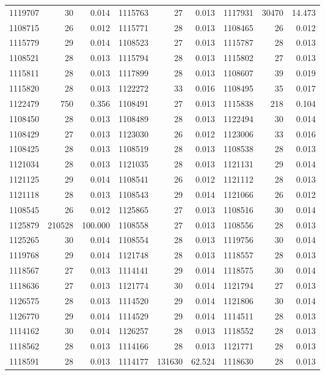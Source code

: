 \documentclass[11pt,a4paper]{article}
\begin{document}
\begin{longtable}{rrr|rrr|rrr}
1119707 & 30 & 0.014 & 1115763 & 27 & 0.013 & 1117931 & 30470 & 14.473\\
1108715 & 26 & 0.012 & 1115771 & 28 & 0.013 & 1108465 & 26 & 0.012\\
1115779 & 29 & 0.014 & 1108523 & 27 & 0.013 & 1115787 & 28 & 0.013\\
1108521 & 28 & 0.013 & 1115794 & 28 & 0.013 & 1115802 & 27 & 0.013\\
1115811 & 28 & 0.013 & 1117899 & 28 & 0.013 & 1108607 & 39 & 0.019\\
1115820 & 28 & 0.013 & 1122272 & 33 & 0.016 & 1108495 & 35 & 0.017\\
1122479 & 750 & 0.356 & 1108491 & 27 & 0.013 & 1115838 & 218 & 0.104\\
1108450 & 28 & 0.013 & 1108489 & 28 & 0.013 & 1122494 & 30 & 0.014\\
1108429 & 27 & 0.013 & 1123030 & 26 & 0.012 & 1123006 & 33 & 0.016\\
1108425 & 28 & 0.013 & 1108519 & 28 & 0.013 & 1108538 & 28 & 0.013\\
1121034 & 28 & 0.013 & 1121035 & 28 & 0.013 & 1121131 & 29 & 0.014\\
1121125 & 29 & 0.014 & 1108541 & 26 & 0.012 & 1121112 & 28 & 0.013\\
1121118 & 28 & 0.013 & 1108543 & 29 & 0.014 & 1121066 & 26 & 0.012\\
1108545 & 26 & 0.012 & 1125865 & 27 & 0.013 & 1108516 & 30 & 0.014\\
1125879 & 210528 & 100.000 & 1108558 & 27 & 0.013 & 1108556 & 28 & 0.013\\
1125265 & 30 & 0.014 & 1108554 & 28 & 0.013 & 1119756 & 30 & 0.014\\
1119768 & 29 & 0.014 & 1121748 & 28 & 0.013 & 1118557 & 28 & 0.013\\
1118567 & 27 & 0.013 & 1114141 & 29 & 0.014 & 1118575 & 30 & 0.014\\
1118636 & 27 & 0.013 & 1121774 & 30 & 0.014 & 1121794 & 27 & 0.013\\
1126575 & 28 & 0.013 & 1114520 & 29 & 0.014 & 1121806 & 30 & 0.014\\
1126770 & 29 & 0.014 & 1114529 & 29 & 0.014 & 1114511 & 28 & 0.013\\
1114162 & 30 & 0.014 & 1126257 & 28 & 0.013 & 1118552 & 28 & 0.013\\
1118562 & 28 & 0.013 & 1114166 & 28 & 0.013 & 1121771 & 28 & 0.013\\
1118591 & 28 & 0.013 & 1114177 & 131630 & 62.524 & 1118630 & 28 & 0.013\\

\end{longtable}
\end{document}

